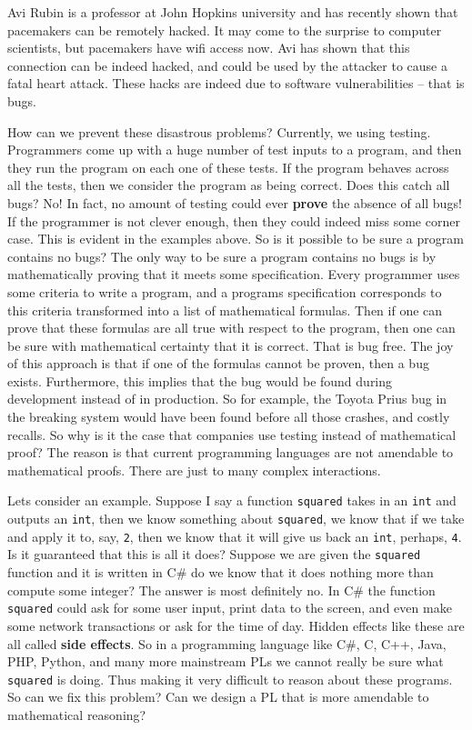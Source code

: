 \documentclass{article}
\begin{document}
Avi Rubin is a professor at John Hopkins university and has recently
shown that pacemakers can be remotely hacked.  It may come to the
surprise to computer scientists, but pacemakers have wifi access now.
Avi has shown that this connection can be indeed hacked, and could be
used by the attacker to cause a fatal heart attack.  These hacks are
indeed due to software vulnerabilities -- that is bugs.  

How can we prevent these disastrous problems?  Currently, we using
testing.  Programmers come up with a huge number of test inputs to a
program, and then they run the program on each one of these tests.  If
the program behaves across all the tests, then we consider the program
as being correct.  Does this catch all bugs?  No!  In fact, no amount
of testing could ever \textbf{prove} the absence of all bugs!  If the
programmer is not clever enough, then they could indeed miss some
corner case.  This is evident in the examples above.  So is it
possible to be sure a program contains no bugs?  The only way to be
sure a program contains no bugs is by mathematically proving that it
meets some specification.  Every programmer uses some criteria to
write a program, and a programs specification corresponds to this
criteria transformed into a list of mathematical formulas.  Then if
one can prove that these formulas are all true with respect to the
program, then one can be sure with mathematical certainty that it is
correct.  That is bug free.  The joy of this approach is that if one
of the formulas cannot be proven, then a bug exists.  Furthermore,
this implies that the bug would be found during development instead of
in production.  So for example, the Toyota Prius bug in the breaking
system would have been found before all those crashes, and costly
recalls.  So why is it the case that companies use testing instead of
mathematical proof?  The reason is that current programming languages
are not amendable to mathematical proofs.  There are just to many
complex interactions.

Lets consider an example.  Suppose I say a function \verb|squared|
takes in an \verb|int| and outputs an \verb|int|, then we know
something about \verb|squared|, we know that if we take and apply it
to, say, \verb|2|, then we know that it will give us back an
\verb|int|, perhaps, \verb|4|.  Is it guaranteed that this is all it
does?  Suppose we are given the \verb|squared| function and it is
written in C\# do we know that it does nothing more than compute some
integer?  The answer is most definitely no.  In C\# the function
\verb|squared| could ask for some user input, print data to the
screen, and even make some network transactions or ask for the time of
day.  Hidden effects like these are all called \textbf{side effects}.
So in a programming language like C\#, C, C++, Java, PHP, Python, and
many more mainstream PLs we cannot really be sure what \verb|squared|
is doing.  Thus making it very difficult to reason about these
programs.  So can we fix this problem?  Can we design a PL that is
more amendable to mathematical reasoning?
\end{document}
